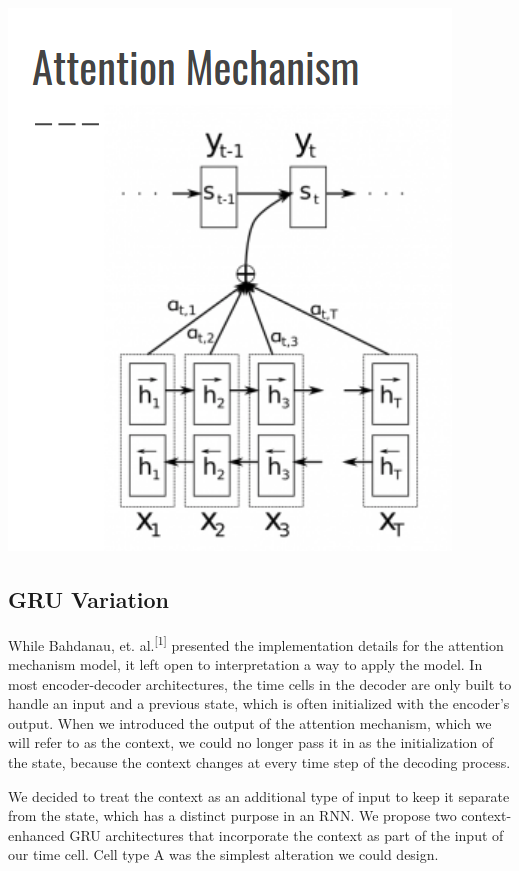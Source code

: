 \documentclass[letterpaper, 10pt]{article}
\begin{document}
\begin{multicols}{2}
\begin{center}
\includegraphics[scale=.3]{attention_mechanism}
\end{center}

\subsection{GRU Variation}
While Bahdanau, et. al.\textsuperscript{[1]} presented the implementation details for the attention
mechanism model, it left open to interpretation a way to apply the model.
In most encoder-decoder architectures, the time cells in the decoder are only built to handle an
input and a previous state, which is often initialized with the encoder’s output.
When we introduced the output of the attention mechanism, which we will refer to as the context,
we could no longer pass it in as the initialization of the state, because the context changes at
every time step of the decoding process.

We decided to treat the context as an additional type of input to keep it separate from the state,
which has a distinct purpose in an RNN.
We propose two context-enhanced GRU architectures that incorporate the context as part of the input
of our time cell.
Cell type A was the simplest alteration we could design.


\end{multicols}
\end{document}
